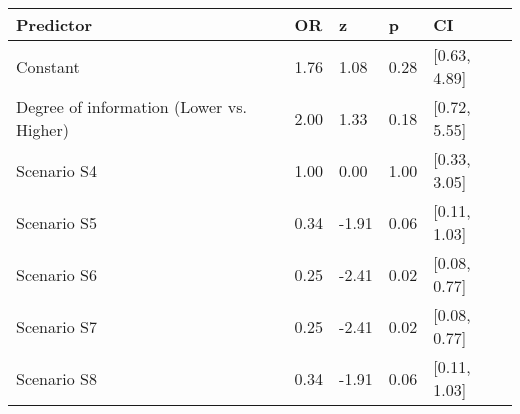 \begin{tabular}{lllll}
  \toprule
Predictor & OR & z & p & CI \\ 
  \midrule
Constant & 1.76 & 1.08 & 0.28 & [0.63, 4.89] \\ 
  Degree of information (Lower vs. Higher) & 2.00 & 1.33 & 0.18 & [0.72, 5.55] \\ 
  Scenario S4 & 1.00 & 0.00 & 1.00 & [0.33, 3.05] \\ 
  Scenario S5 & 0.34 & -1.91 & 0.06 & [0.11, 1.03] \\ 
  Scenario S6 & 0.25 & -2.41 & 0.02 & [0.08, 0.77] \\ 
  Scenario S7 & 0.25 & -2.41 & 0.02 & [0.08, 0.77] \\ 
  Scenario S8 & 0.34 & -1.91 & 0.06 & [0.11, 1.03] \\ 
   \bottomrule
\end{tabular}
